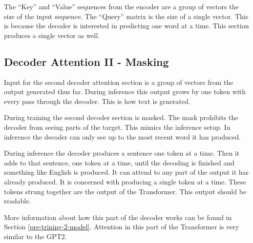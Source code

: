 The ``Key'' and ``Value'' sequences from the encoder are a group of vectors the size of the input sequence. The ``Query'' matrix is the size of a single vector. This is because the decoder is interested in predicting one word at a time. This section produces a single vector as well.


\subsection{Decoder Attention II - Masking}
Input for the second decoder attention section is a group of vectors from the output generated thus far. During inference this output grows by one token with every pass through the decoder. This is how text is generated.

During training the second decoder section is masked. The mask prohibits the decoder from seeing parts of the target. This mimics the inference setup. In inference the decoder can only see up to the most recent word it has produced.

During inference the decoder produces a sentence one token at a time. Then it adds to that sentence, one token at a time, until the decoding is finished and something like English is produced. It can attend to any part of the output it has already produced. It is concerned with producing a single token at a time. These tokens strung together are the output of the Transformer. This output should be readable. 

More information about how this part of the decoder works can be found in Section  \ref{pre-trining-2-model}. Attention in this part of the Transformer is very similar to the GPT2.

